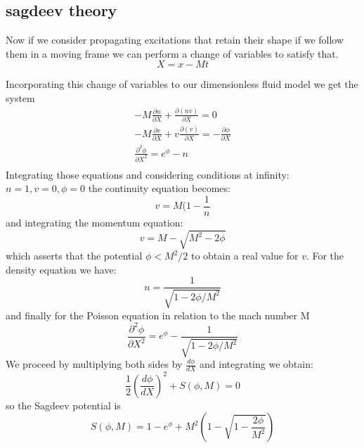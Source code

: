 \documentclass{article}
\begin{document}
\subsection{sagdeev theory}
Now if we  consider propagating excitations that retain their shape if we follow them in a moving frame
we can perform a change of variables to satisfy that. 
\begin{equation} \label{sagdeev:changevars}
	X = x - M t
\end{equation}

Incorporating this change of variables to our dimensionless fluid model we get the system
\begin{equation} \label{sagdeev:systemWithM}
\begin{aligned}
	-M \frac{\partial n}{\partial X} + \frac{\partial (nv)}{\partial X} = 0 \\
	-M \frac{\partial v}{\partial X} + v \frac{\partial(v)}{\partial X} = - \frac{\partial \phi}{\partial X} \\
	 \frac{\partial^2 \phi}{\partial X^2} = e^{\phi} - n \\
\end{aligned}
\end{equation}
Integrating those equations and considering conditions at 
infinity: $n=1,v=0,\phi=0$ the continuity equation becomes:
\begin{equation} \label{sagdeev:continuityWithM}
	v = M(1-\frac{1}{n}
\end{equation}
and integrating the momentum equation:
\begin{equation} \label{sagdeev:momentumWithM}
	v = M - \sqrt{M^2 - 2\phi}
\end{equation}
which asserts that the potential $\phi < M^2/2 $ to obtain a
real value for $v$.
For the density equation we have:
\begin{equation} \label{sagdeev:densityWithM}
	n = \frac{1}{\sqrt{1-2\phi/M^2}}
\end{equation}
and finally for the Poisson equation in relation to the mach number M
\begin{equation}
	\frac{\partial^2 \phi}{\partial X^2} = e^\phi - \frac{1}{\sqrt{1 - 2\phi / M^2}}
\end{equation}
We proceed by multiplying both sides by $\frac{d \phi}{dX}$ and integrating we obtain:
\begin{equation}
	\frac{1}{2}\left(\frac{d \phi}{d X} \right)^2 + S(\phi,M) = 0
\end{equation}
so the Sagdeev potential is
\begin{equation}
 S(\phi,M) = 1 - e^\phi + M^2\left( 1 - \sqrt{1-\frac{2 \phi}{M^2}} \right) 
\end{equation}
\end{document}
